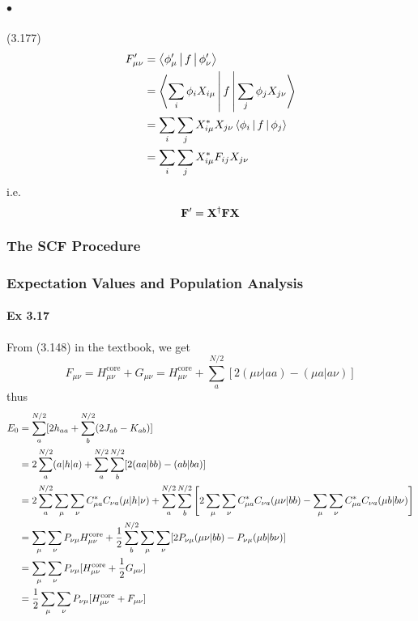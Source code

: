 \documentclass[a4paper]{article}
\DeclareMathOperator{\core}{\mathrm{core}}
\newcommand{\ex}[1]{\paragraph{Ex #1}}
\newcommand{\subex}[1]{\subparagraph{#1}}
\numberwithin{equation}{subsection}
\begin{document}
\subex{$ \bullet $} (3.177)
\begin{align}
F'_{\mu\nu} &= \Braket{\phi'_\mu | f | \phi'_\nu} \notag\\
&= \Braket{\sum_i \phi_i X_{i\mu} | f | \sum_j \phi_j X_{j\nu}} \notag\\
&= \sum_i\sum_j X^*_{i\mu} X_{j\nu} \Braket{\phi_i | f | \phi_j} \notag\\
&= \sum_i\sum_j X^*_{i\mu} F_{ij} X_{j\nu} 
\end{align}
i.e.
\begin{equation}\label{key}
\vb{F}' = \vb{X}^\dagger \vb{F} \vb{X}
\end{equation}

\subsubsection{The SCF Procedure}

\subsubsection{Expectation Values and Population Analysis}
\ex{3.17}
From (3.148) in the textbook, we get
\begin{equation}\label{key}
F_{\mu\nu} = H_{\mu\nu}^{\core} + G_{\mu\nu} = H_{\mu\nu}^{\core} + \sum_a^{N/2}[ 2(\mu\nu|aa) - (\mu a| a\nu)]
\end{equation}
thus
\begin{align}
E_0 &= \sum_a^{N/2} [2 h_{aa} + \sum_b^{N/2} (2 J_{ab} - K_{ab})] \notag\\
&= 2 \sum_a^{N/2} (a|h|a) + \sum_a^{N/2}\sum_b^{N/2} [2 (aa|bb) - (ab|ba)] \notag\\
&= 2 \sum_a^{N/2} \sum_\mu\sum_\nu C_{\mu a}^* C_{\nu a} (\mu| h |\nu) 
+ \sum_a^{N/2}\sum_b^{N/2} \qty[2\sum_\mu\sum_\nu C_{\mu a}^* C_{\nu a} (\mu\nu|bb) - \sum_\mu\sum_\nu C_{\mu a}^* C_{\nu a} (\mu b| b\nu)] \notag\\
&= \sum_\mu\sum_\nu P_{\nu\mu} H_{\mu\nu}^{\core} + \dfrac{1}{2}\sum_b^{N/2}\sum_\mu\sum_\nu[2 P_{\nu\mu}(\mu\nu|bb) - P_{\nu\mu}(\mu b|b\nu)] \notag\\
&= \sum_\mu\sum_\nu P_{\nu\mu} [H_{\mu\nu}^{\core} + \dfrac{1}{2}G_{\mu\nu}] \notag\\
&= \dfrac{1}{2}\sum_\mu\sum_\nu P_{\nu\mu} [H_{\mu\nu}^{\core} + F_{\mu\nu}] \notag\\
\end{align}
\end{document}
